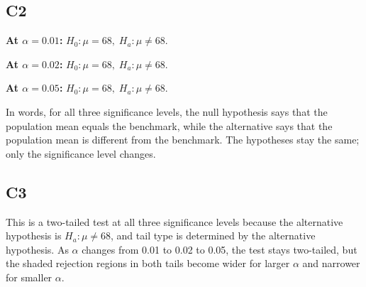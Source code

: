 \begin{ExamProblems}
		\subsection*{C2}
		\textbf{At \(\alpha=0.01\):} \(H_0\colon \mu=68,\; H_a\colon \mu\ne 68\).
		
		\textbf{At \(\alpha=0.02\):} \(H_0\colon \mu=68,\; H_a\colon \mu\ne 68\).
		
		\textbf{At \(\alpha=0.05\):} \(H_0\colon \mu=68,\; H_a\colon \mu\ne 68\).
		
		In words, for all three significance levels, the null hypothesis says that the population mean equals the benchmark, while the alternative says that the population mean is different from the benchmark. The hypotheses stay the same; only the significance level changes.
		
		\subsection*{C3}
		This is a two-tailed test at all three significance levels because the alternative hypothesis is \(H_a\colon \mu\ne 68\), and tail type is determined by the alternative hypothesis. As \(\alpha\) changes from 0.01 to 0.02 to 0.05, the test stays two-tailed, but the shaded rejection regions in both tails become wider for larger \(\alpha\) and narrower for smaller \(\alpha\).
		

\end{ExamProblems}
